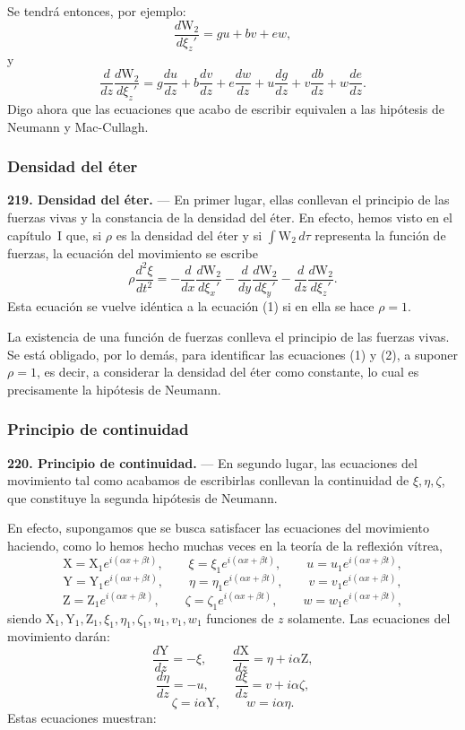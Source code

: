 Se tendrá entonces, por ejemplo:
\[
\frac{d\mathrm{W}_2}{d\xi_z'}=gu+bv+ew,
\]
y
\[
\frac{d}{dz}\frac{d\mathrm{W}_2}{d\xi_z'}=g\frac{du}{dz}+b\frac{dv}{dz}+e\frac{dw}{dz}
+u\frac{dg}{dz}+v\frac{db}{dz}+w\frac{de}{dz}.
\]
Digo ahora que las ecuaciones que acabo de escribir equivalen a las
hipótesis de Neumann y Mac-Cullagh.

\subsubsection{Densidad del éter}

\noindent\textbf{219. Densidad del éter.} — En primer lugar, ellas conllevan el principio de las fuerzas vivas y la
constancia de la densidad del éter. En efecto, hemos visto en el
capítulo~I que, si $\rho$ es la densidad del éter y si
$\int \mathrm{W}_2\,d\tau$ representa la función de fuerzas, la ecuación del
movimiento se escribe
\begin{equation}
\rho\frac{d^2\xi}{dt^2}=-\frac{d}{dx}\frac{d\mathrm{W}_2}{d\xi_x'}
-\frac{d}{dy}\frac{d\mathrm{W}_2}{d\xi_y'}-\frac{d}{dz}\frac{d\mathrm{W}_2}{d\xi_z'}.
\end{equation}
Esta ecuación se vuelve idéntica a la ecuación (1) si en ella se hace
$\rho=1$.

La existencia de una función de fuerzas conlleva el principio de las
fuerzas vivas. Se está obligado, por lo demás, para identificar las
ecuaciones (1) y (2), a suponer $\rho=1$, es decir, a considerar la
densidad del éter como constante, lo cual es precisamente la hipótesis de
Neumann.

\subsubsection{Principio de continuidad}

\noindent\textbf{220. Principio de continuidad.} — En segundo lugar, las
ecuaciones del movimiento tal como acabamos de escribirlas conllevan la
continuidad de $\xi,\eta,\zeta$, que constituye la segunda hipótesis de
Neumann.

En efecto, supongamos que se busca satisfacer las ecuaciones del
movimiento haciendo, como lo hemos hecho muchas veces en la teoría de la
reflexión vítrea,
\[
\mathrm{X}=\mathrm{X}_1e^{i(\alpha x+\beta t)},\qquad
\xi=\xi_1e^{i(\alpha x+\beta t)},\qquad
u=u_1e^{i(\alpha x+\beta t)},
\]
\[
\mathrm{Y}=\mathrm{Y}_1e^{i(\alpha x+\beta t)},\qquad
\eta=\eta_1e^{i(\alpha x+\beta t)},\qquad
v=v_1e^{i(\alpha x+\beta t)},
\]
\[
\mathrm{Z}=\mathrm{Z}_1e^{i(\alpha x+\beta t)},\qquad
\zeta=\zeta_1e^{i(\alpha x+\beta t)},\qquad
w=w_1e^{i(\alpha x+\beta t)},
\]
siendo $\mathrm{X}_1,\mathrm{Y}_1,\mathrm{Z}_1,\xi_1,\eta_1,\zeta_1,u_1,v_1,w_1$
funciones de $z$ solamente. Las ecuaciones del movimiento darán:
\[
\frac{d\mathrm{Y}}{dz}=-\xi,\qquad \frac{d\mathrm{X}}{dz}=\eta+i\alpha\mathrm{Z},
\]
\[
\frac{d\eta}{dz}=-u,\qquad \frac{d\xi}{dz}=v+i\alpha\zeta,
\]
\[
\zeta=i\alpha\mathrm{Y},\qquad w=i\alpha\eta.
\]
Estas ecuaciones muestran:

